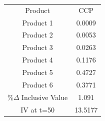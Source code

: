 \begin{tabular}{cc}
Product & CCP \\
Product 1 & 0.0009 \\
Product 2 & 0.0053 \\
Product 3 & 0.0263 \\
Product 4 & 0.1176 \\
Product 5 & 0.4727 \\
Product 6 & 0.3771 \\
$\%\Delta$ Inclusive Value & 1.091 \\
IV at t=50 & 13.5177 \\
\end{tabular}
